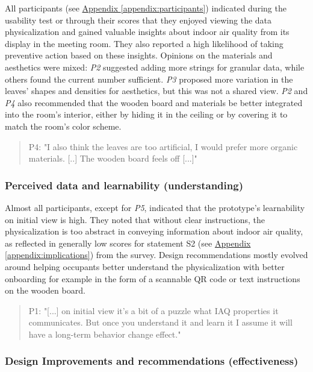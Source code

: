 All participants (see \hyperref[appendix:participants]{Appendix \ref*{appendix:participants}}) indicated during the usability test or through their scores that they enjoyed viewing the data physicalization and gained valuable insights about indoor air quality from its display in the meeting room. They also reported a high likelihood of taking preventive action based on these insights. Opinions on the materials and aesthetics were mixed: \textit{P2} suggested adding more strings for granular data, while others found the current number sufficient. \textit{P3} proposed more variation in the leaves' shapes and densities for aesthetics, but this was not a shared view. \textit{P2} and \textit{P4} also recommended that the wooden board and materials be better integrated into the room's interior, either by hiding it in the ceiling or by covering it to match the room's color scheme.

\begin{quote}
P4: "I also think the leaves are too artificial, I would prefer more organic materials. [..] The wooden board feels off [...]"
\end{quote}

\subsubsection{Perceived data and learnability (understanding)}
Almost all participants, except for \textit{P5}, indicated that the prototype's learnability on initial view is high. They noted that without clear instructions, the physicalization is too abstract in conveying information about indoor air quality, as reflected in generally low scores for statement S2 (see \hyperref[appendix:implications]{Appendix \ref*{appendix:implications}}) from the survey. Design recommendations mostly evolved around helping occupants better understand the physicalization with better onboarding for example in the form of a scannable QR code or text instructions on the wooden board.

\begin{quote}
P1: "[...] on initial view it's a bit of a puzzle what IAQ properties it communicates. But once you understand it and learn it I assume it will have a long-term behavior change effect."
\end{quote}


\subsubsection{Design Improvements and recommendations (effectiveness)}

